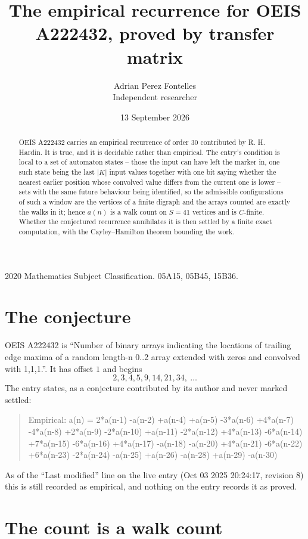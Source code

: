 \documentclass[11pt,a4paper]{article}
\title{The empirical recurrence for OEIS A222432, proved by transfer matrix}
\author{Adrian Perez Fontelles\\ \small Independent researcher}
\date{13 September 2026}
\theoremstyle{plain}
\theoremstyle{definition}
\begin{document}
\maketitle

\begin{abstract}
OEIS A222432 carries an empirical recurrence of order $30$ contributed by R. H. Hardin. It is
true, and it is decidable rather than empirical. The entry's condition is local to a set of automaton states -- those the input can have left the marker in, one such state being the last $|K|$ input values together with one bit saying whether the nearest earlier position whose convolved value differs from the current one is lower -- sets with the same future behaviour being identified, so
the admissible configurations of such a window are the vertices of a finite digraph and the
arrays counted are exactly the walks in it; hence $a(n)$ is a walk count on $S=41$ vertices
and is $C$-finite. Whether the conjectured recurrence annihilates it is then settled by a
finite exact computation, with the Cayley--Hamilton theorem bounding the work.
\end{abstract}

\noindent\small 2020 Mathematics Subject Classification. 05A15, 05B45, 15B36.\normalsize

\section{The conjecture}

OEIS A222432 is ``Number of binary arrays indicating the locations of trailing edge maxima of a random length-n 0..2 array extended with zeros and convolved with 1,1,1.''. It has offset $1$ and begins
\[
2, 3, 4, 5, 9, 14, 21, 34,\ \dots
\]
The entry states, as a conjecture contributed by its author and never marked settled:
\begin{quote}
Empirical: a(n) = 2*a(n-1) -a(n-2) +a(n-4) +a(n-5) -3*a(n-6) +4*a(n-7) -4*a(n-8) +2*a(n-9) -2*a(n-10) +a(n-11) -2*a(n-12) +4*a(n-13) -6*a(n-14) +7*a(n-15) -6*a(n-16) +4*a(n-17) -a(n-18) -a(n-20) +4*a(n-21) -6*a(n-22) +6*a(n-23) -2*a(n-24) -a(n-25) +a(n-26) -a(n-28) +a(n-29) -a(n-30)
\end{quote}
As of the ``Last modified'' line on the live entry (Oct 03 2025 20:24:17, revision 8) this is still
recorded as empirical, and nothing on the entry records it as proved.

\section{The count is a walk count}
\end{document}
